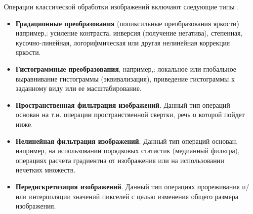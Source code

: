 \documentclass[12pt]{article}
\begin{document}
\begin{sloppypar}
Операции классической обработки изображений включают следующие типы \cite{Gonsales2019Digital}.
\begin{itemize}
    \item \textbf{Градационные преобразования} (попиксильные преобразования яркости) например,:
    усиление контраста, инверсия (получение негатива), степенная, кусочно-линейная, логорифмическая или другая нелинейная коррекция яркости.
   \item \textbf{Гистограммные преобразования},  например,:   локальное или глобальное выравнивание гистограммы (эквивализация), приведение гистограммы к заданному виду или ее масштабирование.
   \item \textbf{Пространственная фильтрация изображений}. Данный тип операций основан на т.н. операции пространственной свертки, речь о которой пойдет ниже. 
   \item \textbf{Нелинейная фильтрация изображений}. Данный тип операций основан, например, на использовании порядковых статистик (медианный фильтра), операциях расчета градиентна от изображения или на использовании нечетких множеств.
   \item \textbf{Передискретизация изображений}. Данный тип операциях прореживания и/или интерполяции  значений пикселей с целью изменения общего размера изображения.
   \newline 
\end{itemize} 


\end{sloppypar}
\end{document}
